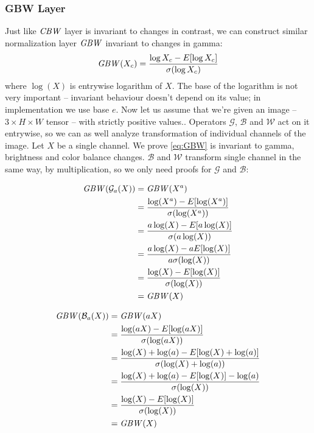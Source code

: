 \subsubsection{GBW Layer}
Just like $\mathit{CBW}$ layer is invariant to changes in contrast,
we can construct similar normalization layer $\mathit{GBW}$ invariant to changes in
gamma:
\begin{equation}
    \mathit{GBW}(X_c) = \frac{\log{X_c}-E[\log{X_c}]}{\sigma(\log{X_c})}
    \label{eq:GBW}
\end{equation}
where $\log(X)$ is entrywise logarithm of $X$. The base of the
logarithm is not very important -- invariant behaviour doesn't depend on its
value; in implementation we use base $e$.
Now let us assume that we're given an image -- $3\times H \times W$ tensor --
with strictly positive values..
Operators $\mathcal{G}$, $\mathcal{B}$ and $\mathcal{W}$ act on it entrywise, so
we can as well analyze transformation of individual channels of the image.
Let $X$ be a single channel.
We prove \ref{eq:GBW} is invariant to gamma, brightness and color balance
changes. $\mathcal{B}$ and $\mathcal{W}$ transform single channel in the same
way, by multiplication,
so we only need proofs for $\mathcal{G}$ and $\mathcal{B}$:

\begin{align*}
    \mathit{GBW}(\mathcal{G}_a(X)) &=
    \mathit{GBW}(X^a) \\
    &= \frac{\log(X^a)-E[\log(X^a)]}{\sigma(\log(X^a))} \\
    &= \frac{a\log(X)-E[a\log(X)]}{\sigma(a\log(X))} \\
    &= \frac{a\log(X)-aE[\log(X)]}{a\sigma(\log(X))} \\
    &= \frac{\log(X)-E[\log(X)]}{\sigma(\log(X))} \\
    &= \mathit{GBW}(X)
\end{align*}

\begin{align*}
    \mathit{GBW}(\mathcal{B}_a(X)) &=
    \mathit{GBW}(aX) \\
    &= \frac{\log(aX)-E[\log(aX)]}{\sigma(\log(aX))} \\
    &= \frac{\log(X)+\log(a)-E[\log(X)+\log(a)]}{\sigma(\log(X)+\log(a))} \\
    &= \frac{\log(X)+\log(a)-E[\log(X)]-\log(a)}{\sigma(\log(X))} \\
    &= \frac{\log(X)-E[\log(X)]}{\sigma(\log(X))} \\
    &= \mathit{GBW}(X)
\end{align*}

